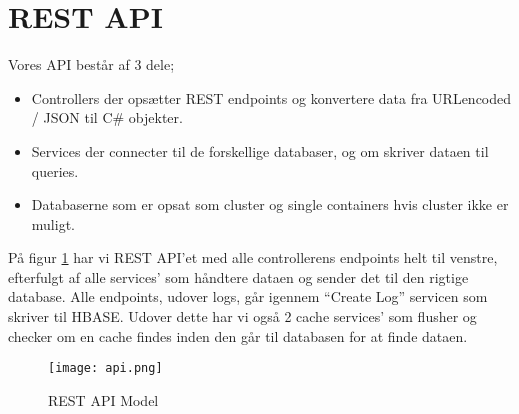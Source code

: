\section{REST API}
Vores API består af 3 dele;
\begin{itemize}
    \item Controllers der opsætter REST endpoints og konvertere data fra URLencoded / JSON til C\# objekter.
    \item Services der connecter til de forskellige databaser, og om skriver dataen til queries.
    \item Databaserne som er opsat som cluster og single containers hvis cluster ikke er muligt.
\end{itemize}
På figur \ref{fig::api} har vi REST API’et med alle controllerens endpoints helt til venstre, efterfulgt af alle services’ som håndtere dataen og sender det til den rigtige database. Alle endpoints, udover logs, går igennem “Create Log” servicen som skriver til HBASE. Udover dette har vi også 2 cache services’ som flusher og checker om en cache findes inden den går til databasen for at finde dataen.

\begin{figure}[H]
    \centering
    \texttt{[image: api.png]}
    \caption{REST API Model}
    \label{fig::api}
\end{figure}